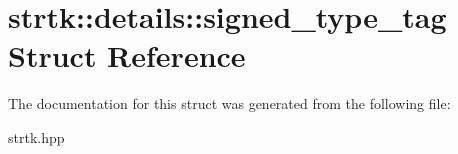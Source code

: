 \hypertarget{structstrtk_1_1details_1_1signed__type__tag}{\section{strtk\-:\-:details\-:\-:signed\-\_\-type\-\_\-tag Struct Reference}
\label{structstrtk_1_1details_1_1signed__type__tag}
}


The documentation for this struct was generated from the following file\-:\begin{DoxyCompactItemize}
\item 
strtk.\-hpp\end{DoxyCompactItemize}
